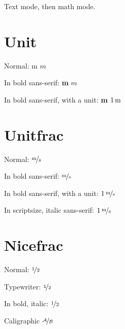 \documentclass{article}
\begin{document}
Text mode, then math mode.

\section{Unit}
Normal: \unit{m} $\unit{m}$

In bold sans-serif:
{\sffamily\bfseries\unit{m} }
{\sffamily\bfseries$\unit{m}$}

In bold sans-serif, with a unit:
{\sffamily\bfseries\unit[1]{m}}
{\sffamily\bfseries$\unit[1]{m}$}

\section{Unitfrac}
Normal:  $\unitfrac{m}{s}$

In bold sans-serif:
{\sffamily\bfseries{}}
{\sffamily\bfseries$\unitfrac{m}{s}$}

In bold sans-serif, with a unit:
{\sffamily\bfseries{}}
{\sffamily\bfseries$\unitfrac[1]{m}{s}$}

In scriptsize, italic sans-serif:
{\scriptsize\sffamily\itshape{}}
{\scriptsize\sffamily\itshape$\unitfrac[1]{m}{s}$}


\section{Nicefrac}
Normal:  $\nicefrac{1}{2}$

Typewriter:  $\nicefrac[\texttt]{1}{2}$

In bold, italic:
{\bfseries\itshape{}}
{\bfseries\itshape$\nicefrac{1}{2}$}

Caligraphic $\nicefrac[\mathcal]{A}{B}$
\end{document}
